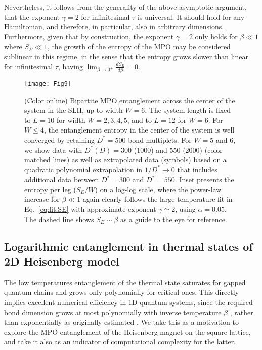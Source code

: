 \documentclass[aps,prx,twocolumn,showpacs,psfig,superscriptaddress,longbibliography]{revtex4-1}
\newcommand{\Eq}[1]{Eq.~\eqref{#1}}
\def\Dstar{D^\ast}
\begin{document}
Nevertheless, it follows from the generality of the above asymptotic
argument, that the exponent $\gamma=2$ for infinitesimal $\tau$ is
universal.  It should hold for any Hamiltonian, and therefore, in
particular, also in arbitrary dimensions.  Furthermore, given that
by construction, the exponent $\gamma=2$ only holds for $\beta\ll 1$
where $S_E\ll 1$, the growth of the entropy of the MPO may be
considered sublinear in this regime, in the sense that the entropy
grows slower than linear for infinitesimal $\tau$, having
$\lim_{\beta\to 0^+} \tfrac{d S_E}{d\beta} = 0$.

\begin{figure}[tbp]
\texttt{[image: Fig9]}
\caption{(Color online)
   Bipartite MPO entanglement across the center of the system
   in the SLH, up to width $W=6$.
   The system length is fixed to $L=10$ for width
   $W=2,3,4,5$, and to $L=12$ for $W=6$.  For $W\leq 4$, the
   entanglement entropy in the center of the system is well
   converged by retaining $\Dstar=500$ bond multiplets.  For
   $W=5$ and $6$, we show data with $\Dstar (D) =300$ (1000)
   and $550$ (2000) (color matched lines) as well as
   extrapolated data (symbols) based on a quadratic
   polynomial extrapolation in $1/\Dstar \to 0$ that includes
   additional data between $\Dstar=300$ and $\Dstar=550$.
   Inset presents the entropy per leg ($S_E/W$) on a log-log
   scale, where the power-law increase for $\beta \ll 1$
   again clearly follows the large temperature fit in
   \Eq{eq:fit:SE} with approximate exponent $\gamma\simeq 2$,
   using $\alpha=0.05$.
%
   The dashed line shows
   $S_E\sim\beta$ as a guide to the eye for reference.
}
\label{Fig:EntSquare}
\end{figure}

\subsection{Logarithmic entanglement in thermal states of 2D
Heisenberg model} \label{sec:ent2D}

The low temperatures entanglement of the thermal state saturates for
gapped quantum chains and grows only polynomially for critical ones.
This directly implies excellent numerical efficiency in 1D quantum
systems, since the required bond dimension grows at most
polynomially with inverse temperature $\beta$
\cite{Prosen.t+:2007:Entropy,Marko.z+:2008:Complexity}, rather than
exponentially as originally estimated
\cite{Hastings.m.b:2006:Gapped}.
%
We take this as a motivation to explore the MPO entanglement of the
Heisenberg magnet on the square lattice, and take it also as an
indicator of computational complexity for the latter. 
\end{document}
